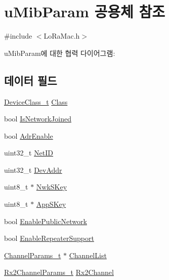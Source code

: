 \hypertarget{unionu_mib_param}{}\section{u\+Mib\+Param 공용체 참조}
\label{unionu_mib_param}


{\ttfamily \#include $<$Lo\+Ra\+Mac.\+h$>$}



u\+Mib\+Param에 대한 협력 다이어그램\+:
\subsection*{데이터 필드}
\begin{DoxyCompactItemize}
\item 
\mbox{\hyperlink{group___l_o_r_a_m_a_c_ga29dc2e097802faaf8fbd0e18ff99695f}{Device\+Class\+\_\+t}} \mbox{\hyperlink{unionu_mib_param_a1ca946ebc53171e9f0f1fc39c005a7a6}{Class}}
\item 
bool \mbox{\hyperlink{unionu_mib_param_a1a4811dfe6101a9f87ecb1aaaf61e6c7}{Is\+Network\+Joined}}
\item 
bool \mbox{\hyperlink{unionu_mib_param_a04efa8698eeea64f27b216d64e598c0d}{Adr\+Enable}}
\item 
uint32\+\_\+t \mbox{\hyperlink{unionu_mib_param_a84a14c879508144e9961372ace234169}{Net\+ID}}
\item 
uint32\+\_\+t \mbox{\hyperlink{unionu_mib_param_a8644153b1c46ffcaeb2b44b5544a2c1a}{Dev\+Addr}}
\item 
uint8\+\_\+t $\ast$ \mbox{\hyperlink{unionu_mib_param_a04e90b783b4e6841ecda8d32d10dc90e}{Nwk\+S\+Key}}
\item 
uint8\+\_\+t $\ast$ \mbox{\hyperlink{unionu_mib_param_a46a2c1c82bda378fb02d20db36bbe414}{App\+S\+Key}}
\item 
bool \mbox{\hyperlink{unionu_mib_param_aff3bd8c7ac1d2fe36ed22c15c25273aa}{Enable\+Public\+Network}}
\item 
bool \mbox{\hyperlink{unionu_mib_param_a6af0230b4a6c8b1caf81b8eb6be2ca1f}{Enable\+Repeater\+Support}}
\item 
\mbox{\hyperlink{group___l_o_r_a_m_a_c_ga1360ca6f82c6d125ea43a9dad9b56184}{Channel\+Params\+\_\+t}} $\ast$ \mbox{\hyperlink{unionu_mib_param_ad8f366dd9087f9cdaa4f7021f2d6e2b9}{Channel\+List}}
\item 
\mbox{\hyperlink{group___l_o_r_a_m_a_c_ga8f57f29481ea92c24f6af04b96a95e0f}{Rx2\+Channel\+Params\+\_\+t}} \mbox{\hyperlink{unionu_mib_param_aa0fbe93ff398020c65d2431af19368e8}{Rx2\+Channel}}

\end{DoxyCompactItemize}
